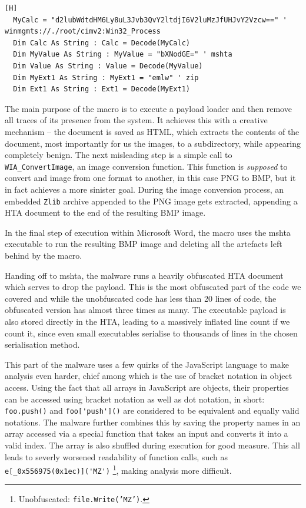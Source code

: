 \begin{lstlisting}[language=VBScript, caption={Encoded strings in the macro}][H]
  MyCalc = "d2lubWdtdHM6Ly8uL3Jvb3QvY2ltdjI6V2luMzJfUHJvY2Vzcw==" ' winmgmts://./root/cimv2:Win32_Process
  Dim Calc As String : Calc = Decode(MyCalc)
  Dim MyValue As String : MyValue = "bXNodGE=" ' mshta
  Dim Value As String : Value = Decode(MyValue)
  Dim MyExt1 As String : MyExt1 = "emlw" ' zip
  Dim Ext1 As String : Ext1 = Decode(MyExt1)
\end{lstlisting}

The main purpose of the macro is to execute a payload loader and then remove all traces of its presence from the system.
It achieves this with a creative mechanism -- the document is saved as \acrshort{HTML}, which extracts the contents of the
document, most importantly for us the images, to a subdirectory, while appearing completely benign. The next misleading
step is a simple call to \verb+WIA_ConvertImage+, an image conversion function. This function is \emph{supposed} to
convert and image from one format to another, in this case \acrshort{PNG} to \acrshort{BMP}, but it in fact achieves a
more sinister goal. During the image conversion process, an embedded \verb+Zlib+ archive appended to the \acrshort{PNG}
image gets extracted, appending a \acrfull{HTA} document to the end of the resulting \acrshort{BMP} image.

In the final step of execution within Microsoft Word, the macro uses the \acrfull{mshta} executable to run the resulting
\acrshort{BMP} image and deleting all the artefacts left behind by the macro.

Handing off to \acrshort{mshta}, the malware runs a heavily obfuscated \acrshort{HTA} document which serves to drop the
payload. This is the most obfuscated part of the code we covered and while the unobfuscated code has less than 20 lines
of code, the obfuscated version has almost three times as many. The executable payload is also stored directly in the
\acrshort{HTA}, leading to a massively inflated line count if we count it, since even small executables serialise to
thousands of lines in the chosen serialisation method. 

This part of the malware uses a few quirks of the JavaScript language to make analysis even harder, chief among which is
the use of bracket notation in object access. Using the fact that all arrays in JavaScript are objects, their properties
can be accessed using bracket notation as well as dot notation, in short: \verb+foo.push()+ and \verb+foo['push']()+ are 
considered to be equivalent and equally valid notations. 
The malware further combines this by saving the property names in an array accessed via a special function that takes an 
input and converts it into a valid index. The array is also shuffled during execution for good measure. This all leads to 
severly worsened readability of function calls, such as \verb+e[_0x556975(0x1ec)]('MZ')+
\footnote{Unobfuscated: \texttt{file.Write('MZ')}.}, making analysis more difficult. %


